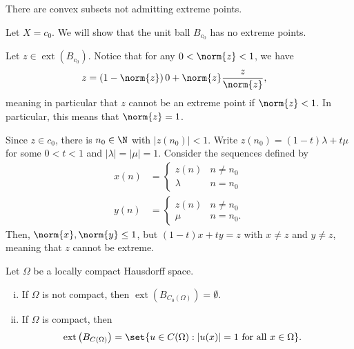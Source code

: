 \documentclass[10pt]{mypackage}
\begin{document}
There are convex subsets not admitting extreme points.
\begin{example}
  Let $X = c_0$. We will show that the unit ball $B_{c_0}$ has no extreme points.

  Let $z\in \operatorname{ext}\left( B_{c_0} \right)$. Notice that for any $0 < \norm{z} < 1$, we have
  \begin{align*}
    z &= \left( 1- \norm{z} \right)0 + \norm{z} \frac{z}{\norm{z}},
  \end{align*}
  meaning in particular that $z$ cannot be an extreme point if $\norm{z} < 1$. In particular, this means that $\norm{z} = 1$.

  Since $z\in c_0$, there is $n_0\in \N$ with $\left\vert z\left( n_0 \right) \right\vert < 1$. Write $z\left( n_0 \right) = \left( 1-t \right)\lambda + t\mu$ for some $0 < t < 1$ and $\left\vert \lambda \right\vert = \left\vert \mu \right\vert = 1$. Consider the sequences defined by
  \begin{align*}
    x(n) &= \begin{cases}
      z(n) & n\neq n_0\\
      \lambda & n = n_0
    \end{cases}\\
      y(n) &= \begin{cases}
        z(n) & n\neq n_0\\
        \mu & n = n_0.
      \end{cases}
  \end{align*}
  Then, $\norm{x},\norm{y}\leq 1$, but $\left( 1-t \right)x + ty = z$ with $x\neq z$ and $y\neq z$, meaning that $z$ cannot be extreme.
\end{example}
\begin{proposition}
  Let $\Omega$ be a locally compact Hausdorff space.
  \begin{enumerate}[(i)]
    \item If $\Omega$ is not compact, then $\operatorname{ext}\left( B_{C_0(\Omega)} \right) = \emptyset$.
    \item If $\Omega$ is compact, then 
      \begin{align*}
        \operatorname{ext}\left( B_{C(\Omega)} \right) &= \set{u\in C(\Omega) : \left\vert u(x) \right\vert = 1\text{ for all }x\in \Omega}.
      \end{align*}
  \end{enumerate}
\end{proposition}
\end{document}
